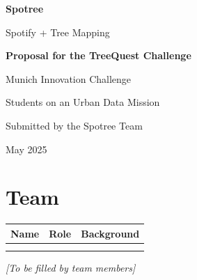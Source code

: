 \documentclass[11pt,a4paper]{article}
\begin{document}
\begin{titlepage}
\centering
\vspace*{3cm}

{\Huge\bfseries\color{spotdark} Spotree\par}
\vspace{0.5cm}
{\Large\color{spotlight} Spotify + Tree Mapping\par}
\vspace{1.5cm}
{\large\bfseries Proposal for the TreeQuest Challenge\par}
\vspace{0.5cm}
{\large Munich Innovation Challenge\par}
{\large\color{spotgray} Students on an Urban Data Mission\par}

\vspace{2cm}


\vspace{2cm}

{\large\color{spotgray} Submitted by the Spotree Team\par}
\vspace{0.5cm}
{\color{spotgray} May 2025\par}

\vfill
\end{titlepage}

\tableofcontents
\newpage

\section{Team}

\begin{center}
\begin{tabularx}{\textwidth}{l l X}
\toprule
\textbf{Name} & \textbf{Role} & \textbf{Background} \\
\midrule
 &  &  \\
 &  &  \\
\bottomrule
\end{tabularx}
\end{center}

\textit{[To be filled by team members]}

\end{document}

